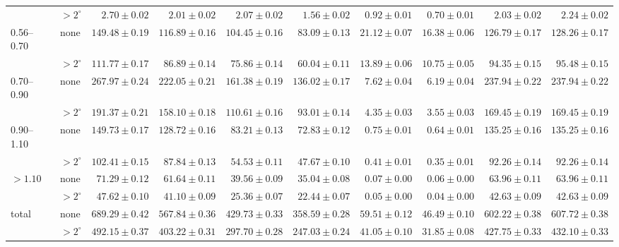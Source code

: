 \begin{table}[H]
{\begin{tabular}{llrrrrrrrr}
 & $>2^\circ$ & $2.70\pm0.02$ & $2.01\pm0.02$ & $2.07\pm0.02$ & $1.56\pm0.02$ & $0.92\pm0.01$ & $0.70\pm0.01$ & $2.03\pm0.02$ & $2.24\pm0.02$ \\
0.56--0.70 & none & $149.48\pm0.19$ & $116.89\pm0.16$ & $104.45\pm0.16$ & $83.09\pm0.13$ & $21.12\pm0.07$ & $16.38\pm0.06$ & $126.79\pm0.17$ & $128.26\pm0.17$ \\
 & $>2^\circ$ & $111.77\pm0.17$ & $86.89\pm0.14$ & $75.86\pm0.14$ & $60.04\pm0.11$ & $13.89\pm0.06$ & $10.75\pm0.05$ & $94.35\pm0.15$ & $95.48\pm0.15$ \\
0.70--0.90 & none & $267.97\pm0.24$ & $222.05\pm0.21$ & $161.38\pm0.19$ & $136.02\pm0.17$ & $7.62\pm0.04$ & $6.19\pm0.04$ & $237.94\pm0.22$ & $237.94\pm0.22$ \\
 & $>2^\circ$ & $191.37\pm0.21$ & $158.10\pm0.18$ & $110.61\pm0.16$ & $93.01\pm0.14$ & $4.35\pm0.03$ & $3.55\pm0.03$ & $169.45\pm0.19$ & $169.45\pm0.19$ \\
0.90--1.10 & none & $149.73\pm0.17$ & $128.72\pm0.16$ & $83.21\pm0.13$ & $72.83\pm0.12$ & $0.75\pm0.01$ & $0.64\pm0.01$ & $135.25\pm0.16$ & $135.25\pm0.16$ \\
 & $>2^\circ$ & $102.41\pm0.15$ & $87.84\pm0.13$ & $54.53\pm0.11$ & $47.67\pm0.10$ & $0.41\pm0.01$ & $0.35\pm0.01$ & $92.26\pm0.14$ & $92.26\pm0.14$ \\
$>1.10$ & none & $71.29\pm0.12$ & $61.64\pm0.11$ & $39.56\pm0.09$ & $35.04\pm0.08$ & $0.07\pm0.00$ & $0.06\pm0.00$ & $63.96\pm0.11$ & $63.96\pm0.11$ \\
 & $>2^\circ$ & $47.62\pm0.10$ & $41.10\pm0.09$ & $25.36\pm0.07$ & $22.44\pm0.07$ & $0.05\pm0.00$ & $0.04\pm0.00$ & $42.63\pm0.09$ & $42.63\pm0.09$ \\
total & none & $689.29\pm0.42$ & $567.84\pm0.36$ & $429.73\pm0.33$ & $358.59\pm0.28$ & $59.51\pm0.12$ & $46.49\pm0.10$ & $602.22\pm0.38$ & $607.72\pm0.38$ \\
 & $>2^\circ$ & $492.15\pm0.37$ & $403.22\pm0.31$ & $297.70\pm0.28$ & $247.03\pm0.24$ & $41.05\pm0.10$ & $31.85\pm0.08$ & $427.75\pm0.33$ & $432.10\pm0.33$ \\
\bottomrule
\end{tabular}}
\end{table}
